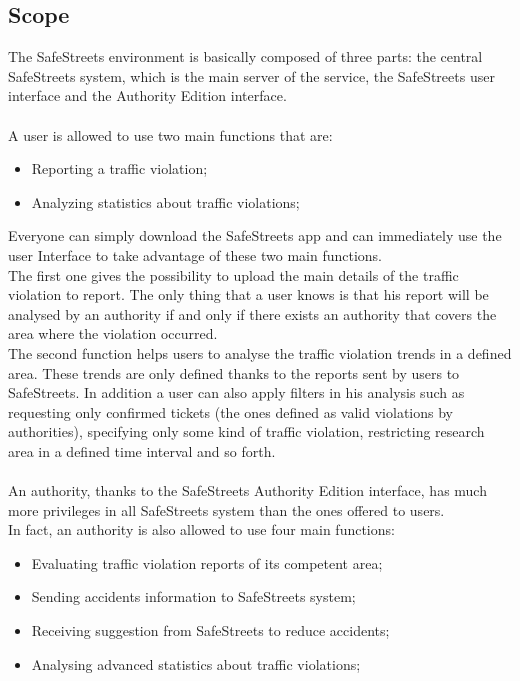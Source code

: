 \documentclass{article}
\begin{document}
		\subsection{Scope}
			The SafeStreets environment is basically composed of three parts: the central SafeStreets system, which is the main server of the service, the SafeStreets user interface and the Authority Edition interface. \\\\
			A user is allowed to use two main functions that are:
			\begin{itemize}
				\item Reporting a traffic violation;
				\item Analyzing statistics about traffic violations;
			\end{itemize}
			Everyone can simply download the SafeStreets app and can immediately use the user Interface to take advantage of these two main functions.\\
	    	The first one gives the possibility to upload the main details of the traffic violation to report. The only thing that a user knows is that his report will be analysed by an authority if and only if there exists an authority that covers the area where the violation occurred.\\
	    	The second function helps users to analyse the traffic violation trends in a defined area. These trends are only defined thanks to the reports sent by users to SafeStreets. In addition a user can also apply filters in his analysis such as requesting only confirmed tickets (the ones defined as valid violations by authorities), specifying only some kind of traffic violation, restricting research area in a defined time interval and so forth.\\\\
	    	An authority, thanks to the SafeStreets Authority Edition interface, has much more privileges in all SafeStreets system than the ones offered to users.\\
	    	In fact, an authority is also allowed to use four main functions:
	    	\begin{itemize}
	    		\item Evaluating traffic violation reports of its competent area;
	    		\item Sending accidents information to SafeStreets system;
	    		\item Receiving suggestion from SafeStreets to reduce accidents;
	    		\item Analysing advanced statistics about traffic violations;
	    	\end{itemize}
\end{document}

